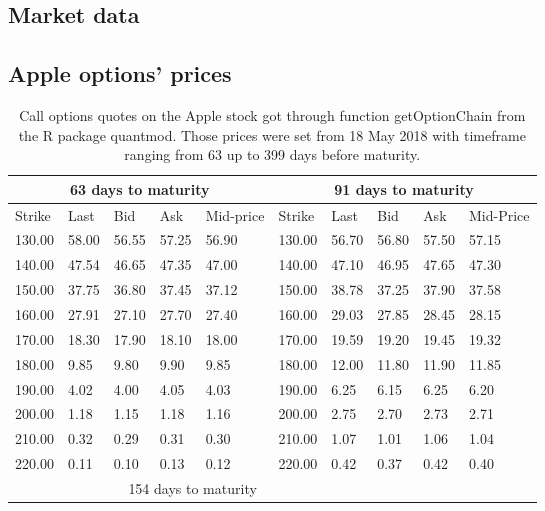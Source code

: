 \documentclass[12pt,a4paper]{report}
\begin{document}
\begin{appendices}
\chapter{Market data}
\label{cha:appendix:market}


\section{Apple options' prices}
\label{sec:appendix:option}

\begin{longtable}{|lllll|lllll|}
\caption[Market option data (AAPL)]{Call options quotes on the Apple stock got through function getOptionChain from the R package quantmod. Those prices were set from 18 May 2018 with timeframe ranging from 63 up to 399 days before maturity.} 
\label{t:market:option}
\endfirsthead
  \hline 
  \multicolumn{5}{|c|}{63 days to maturity} & \multicolumn{5}{c|}{91 days to maturity} \\*
  \hline
  Strike & Last & Bid & Ask & Mid-price & Strike & Last & Bid & Ask & Mid-Price \\*
  \hline
  130.00 & 58.00 & 56.55 & 57.25 & 56.90 &   130.00 & 56.70 & 56.80 & 57.50 & 57.15 \\*
  140.00 & 47.54 & 46.65 & 47.35 & 47.00 &  140.00 & 47.10 & 46.95 & 47.65 & 47.30 \\*
  150.00 & 37.75 & 36.80 & 37.45 & 37.12 &  150.00 & 38.78 & 37.25 & 37.90 & 37.58 \\*
  160.00 & 27.91 & 27.10 & 27.70 & 27.40 &  160.00 & 29.03 & 27.85 & 28.45 & 28.15 \\*
  170.00 & 18.30 & 17.90 & 18.10 & 18.00 &  170.00 & 19.59 & 19.20 & 19.45 & 19.32 \\*
  180.00 & 9.85 & 9.80 & 9.90 & 9.85 &  180.00 & 12.00 & 11.80 & 11.90 & 11.85 \\*
  190.00 & 4.02 & 4.00 & 4.05 & 4.03 &  190.00 & 6.25 & 6.15 & 6.25 & 6.20 \\*
  200.00 & 1.18 & 1.15 & 1.18 & 1.16 &  200.00 & 2.75 & 2.70 & 2.73 & 2.71 \\*
  210.00 & 0.32 & 0.29 & 0.31 & 0.30 &  210.00 & 1.07 & 1.01 & 1.06 & 1.04 \\*
  220.00 & 0.11 & 0.10 & 0.13 & 0.12 &  220.00 & 0.42 & 0.37 & 0.42 & 0.40 \\*
  \hline \pagebreak \hline
  \multicolumn{5}{|c|}{126 days to maturity} & \multicolumn{5}{c|}{154 days to maturity} \\

\end{longtable}
\end{appendices}
\end{document}
